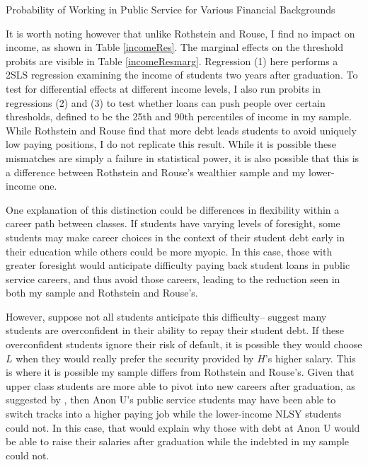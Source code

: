 \documentclass[12pt]{article}
\newcommand{\regs}{../Analysis/Regressions/Output/}
\begin{document}
	\begin{table}
		\centering 
		\caption{Probability of Working in Public Service for Various Financial Backgrounds}
		
		\label{probest}
	\end{table}
	
	It is worth noting however that unlike Rothstein and Rouse, I find no impact on income, as shown in Table \ref{incomeRes}. The marginal effects on the threshold probits are visible in Table \ref{incomeResmarg}. Regression (1) here performs a 2SLS regression examining the income of students two years after graduation. To test for differential effects at different income levels, I also run probits in regressions (2) and (3) to test whether loans can push people over certain thresholds, defined to be the 25th and 90th percentiles of income in my sample. While Rothstein and Rouse find that more debt leads students to avoid uniquely low paying positions, I do not replicate this result. While it is possible these mismatches are simply a failure in statistical power, it is also possible that this is a difference between Rothstein and Rouse's wealthier sample and my lower-income one. 
	
	One explanation of this distinction could be differences in flexibility within a career path between classes. If students have varying levels of foresight, some students may make career choices in the context of their student debt early in their education while others could be more myopic. In this case, those with greater foresight would anticipate difficulty paying back student loans in public service careers, and thus avoid those careers, leading to the reduction seen in both my sample and Rothstein and Rouse's. 
	
	However, suppose not all students anticipate this difficulty--\textcite{smith2013} suggest many students are overconfident in their ability to repay their student debt. If these overconfident students ignore their risk of default, it is possible they would choose $L$ when they would really prefer the security provided by $H$'s higher salary. This is where it is possible my sample differs from Rothstein and Rouse's. Given that upper class students are more able to pivot into new careers after graduation, as suggested by \textcite{mcleod2009}, then Anon U's public service students may have been able to switch tracks into a higher paying job while the lower-income NLSY students could not. In this case, that would explain why those with debt at Anon U would be able to raise their salaries after graduation while the indebted in my sample could not.
	
\end{document}
